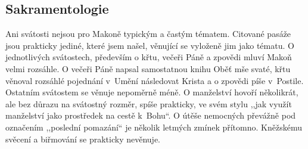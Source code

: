 \subsection{Sakramentologie}

Ani svátosti nejsou pro Makoně typickým a častým tématem. Citované pasáže jsou
prakticky jediné, které jsem našel, věnující se vyloženě jim jako tématu. O
jednotlivých svátostech, především o křtu, večeři Páně a zpovědi mluví Makoň velmi
rozsáhle. O večeři Páně napsal samostatnou knihu Oběť mše svaté,\cite{KaMaMse} křtu věnoval
rozsáhlé pojednání v~Umění následovat Krista\cite{KaMaUNK} a o zpovědi píše
v~Postile.\cite{KaMaPost} Ostatním svátostem
se věnuje nepoměrně méně. O manželství hovoří několikrát, ale bez důrazu na
svátostný rozměr, spíše prakticky, ve svém stylu ,,jak využít manželství jako
prostředek na cestě k~Bohu``. O útěše nemocných převážně pod označením
,,poslední pomazání`` je několik letmých zmínek přítomno. Kněžskému svěcení a biřmování se
prakticky nevěnuje.

